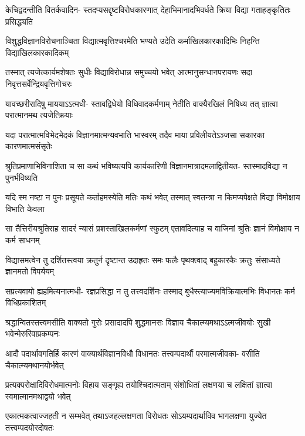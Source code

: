 \fourlineindentedshloka
{केचिद्वदन्तीति वितर्कवादिन-}
{स्तदप्यसद्दृष्टविरोधकारणात्}
{देहाभिमानादभिवर्धते क्रिया}
{विद्या गताहङ्कृतितः प्रसिद्ध्यति} %

\fourlineindentedshloka
{विशुद्धविज्ञानविरोचनाञ्चिता}
{विद्यात्मवृत्तिश्चरमेति भण्यते}
{उदेति कर्माखिलकारकादिभिः}
{निहन्ति विद्याखिलकारकादिकम्} %

\fourlineindentedshloka
{तस्मात् त्यजेत्कार्यमशेषतः सुधीः}
{विद्याविरोधान्न समुच्चयो भवेत्}
{आत्मानुसन्धानपरायणः सदा}
{निवृत्तसर्वेन्द्रियवृत्तिगोचरः} %

\fourlineindentedshloka
{यावच्छरीरादिषु माययाऽऽत्मधी-}
{स्तावद्विधेयो विधिवादकर्मणाम्}
{नेतीति वाक्यैरखिलं निषिध्य तत्}
{ज्ञात्वा परात्मानमथ त्यजेत्क्रियाः} %

\fourlineindentedshloka
{यदा परात्मात्मविभेदभेदकं}
{विज्ञानमात्मन्यवभाति भास्वरम्}
{तदैव माया प्रविलीयतेऽञ्जसा}
{सकारका कारणमात्मसंसृतेः} %

\fourlineindentedshloka
{श्रुतिप्रमाणाभिविनाशिता च सा}
{कथं भविष्यत्यपि कार्यकारिणी}
{विज्ञानमात्रादमलाद्वितीयत-}
{स्तस्मादविद्या न पुनर्भविष्यति} %

\fourlineindentedshloka
{यदि स्म नष्टा न पुनः प्रसूयते}
{कर्ताहमस्येति मतिः कथं भवेत्}
{तस्मात् स्वतन्त्रा न किमप्यपेक्षते}
{विद्या विमोक्षाय विभाति केवला} %

\fourlineindentedshloka
{सा तैत्तिरीयश्रुतिराह सादरं}
{न्यासं प्रशस्ताखिलकर्मणां स्फुटम्}
{एतावदित्याह च वाजिनां श्रुतिः}
{ज्ञानं विमोक्षाय न कर्म साधनम्} %

\fourlineindentedshloka
{विद्यासमत्वेन तु दर्शितस्त्वया}
{क्रतुर्न दृष्टान्त उदाहृतः समः}
{फलैः पृथक्त्वाद् बहुकारकैः क्रतुः}
{संसाध्यते ज्ञानमतो विपर्ययम्} %

\fourlineindentedshloka
{सप्रत्यवायो ह्यहमित्यनात्मधी-}
{रज्ञप्रसिद्धा न तु तत्त्वदर्शिनः}
{तस्माद् बुधैस्त्याज्यमविक्रियात्मभिः}
{विधानतः कर्म विधिप्रकाशितम्} %

\fourlineindentedshloka
{श्रद्धान्वितस्तत्त्वमसीति वाक्यतो}
{गुरोः प्रसादादपि शुद्धमानसः}
{विज्ञाय चैकात्म्यमथाऽऽत्मजीवयोः}
{सुखी भवेन्मेरुरिवाप्रकम्पनः} %

\fourlineindentedshloka
{आदौ पदार्थावगतिर्हि कारणं}
{वाक्यार्थविज्ञानविधौ विधानतः}
{तत्त्वम्पदार्थौ परमात्मजीवका-}
{वसीति चैकात्म्यमथानयोर्भवेत्} %

\fourlineindentedshloka
{प्रत्यक्परोक्षादिविरोधमात्मनोः}
{विहाय सङ्गृह्य तयोश्चिदात्मताम्}
{संशोधितां लक्षणया च लक्षितां}
{ज्ञात्वा स्वमात्मानमथाद्वयो भवेत्} %

\fourlineindentedshloka
{एकात्मकत्वाज्जहती न सम्भवेत्}
{तथाऽजहल्लक्षणता विरोधतः}
{सोऽयम्पदार्थाविव भागलक्षणा}
{युज्येत तत्त्वम्पदयोरदोषतः} %

